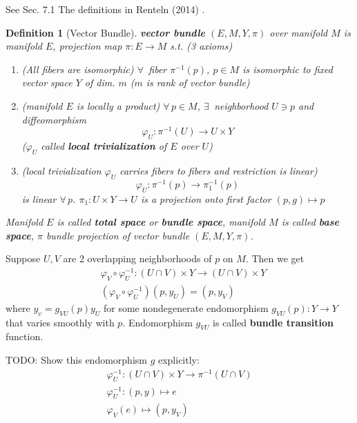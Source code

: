 \documentclass[10pt]{amsart}
\newtheorem{definition}{Definition}
\begin{document}
\begin{multicols*}{2}
See Sec. 7.1 The definitions in Renteln (2014) \cite{Rent2014}.

\begin{definition}[Vector Bundle]
\textbf{vector bundle} $(E,M,Y,\pi)$ over manifold $M$ is manifold $E$, projection map $\pi:E \to M$ s.t. (3 axioms)
\begin{enumerate}
\item (\emph{All fibers are isomorphic}) $\forall \, $ fiber $\pi^{-1}(p)$, $p\in M$ is isomorphic to fixed vector space $Y$ of dim. $m$ ($m$ is rank of vector bundle)
\item (manifold $E$ is locally a product) $\forall \, p \in M$, $\exists \, $ neighborhood $U\ni p$ and diffeomorphism
\begin{equation}\label{Eq:VectorBundleTotalSpaceIsLocalProduct}
\varphi_U: \pi^{-1}(U) \to U\times Y
\end{equation}
($\varphi_U$ called \textbf{local trivialization} of $E$ over $U$)
\item (local trivialization $\varphi_U$ carries fibers to fibers and restriction is linear) 
\begin{equation}
\varphi_U: \pi^{-1}(p) \to \pi^{-1}_1(p)
\end{equation}
is linear $\forall \, p$. $\pi_1: U\times Y \to U$ is a projection onto first factor $(p,g) \mapsto p$
\end{enumerate}

Manifold $E$ is called \textbf{total space} or \textbf{bundle space}, manifold $M$ is called \textbf{base space}, $\pi$ bundle projection of vector bundle $(E,M,Y,\pi)$.
\end{definition}

Suppose $U,V$ are 2 overlapping neighborhoods of $p$ on $M$. Then we get
\begin{equation}
\begin{aligned}
& \varphi_V \circ \varphi_U^{-1} : (U \cap V) \times Y \to (U \cap V) \times Y \\
& (\varphi_V \circ \varphi_U^{-1}) (p, y_U) = (p, y_V)
\end{aligned}
\end{equation}
where $y_v= g_{VU}(p) y_U$ for some nondegenerate endomorphism $g_{VU}(p) : Y \to Y$ that varies smoothly with $p$. Endomorphism $g_{VU}$ is called \textbf{bundle transition} function.

TODO: Show this endomorphism $g$ explicitly:
\[
\begin{gathered}
\varphi_U^{-1}: (U \cap V) \times Y \to \pi^{-1}(U \cap V) \\
\varphi_U^{-1}: (p, y) \mapsto e \\
\varphi_V(e) \mapsto (p, y_V)
\end{gathered}
\]


\end{multicols*}
\end{document}
